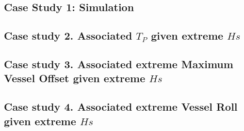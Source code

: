 
\subsection{Case Study 1: Simulation}




\subsection{Case study 2. Associated $T_P$ given extreme $Hs$}


\subsection{Case study 3. Associated extreme Maximum Vessel Offset given extreme $Hs$}

\subsection{Case study 4. Associated extreme Vessel Roll given extreme $Hs$}



